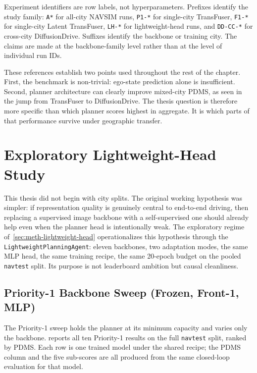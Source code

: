 Experiment identifiers are row labels, not hyperparameters. Prefixes identify the study family: \texttt{A*} for all-city NAVSIM runs, \texttt{P1-*} for single-city TransFuser, \texttt{F1-*} for single-city Latent TransFuser, \texttt{LH-*} for lightweight-head runs, and \texttt{DD-CC-*} for cross-city DiffusionDrive. Suffixes identify the backbone or training city. The claims are made at the backbone-family level rather than at the level of individual run IDs.

These references establish two points used throughout the rest of the chapter. First, the benchmark is non-trivial: ego-state prediction alone is insufficient. Second, planner architecture can clearly improve mixed-city PDMS, as seen in the jump from TransFuser to DiffusionDrive. The thesis question is therefore more specific than which planner scores highest in aggregate. It is which parts of that performance survive under geographic transfer.

\section{Exploratory Lightweight-Head Study}
\label{sec:exp-phase0}

This thesis did not begin with city splits. The original working hypothesis was simpler: if representation quality is genuinely central to end-to-end driving, then replacing a supervised image backbone with a self-supervised one should already help even when the planner head is intentionally weak. The exploratory regime of~\ref{sec:meth-lightweight-head} operationalizes this hypothesis through the \texttt{LightweightPlanningAgent}: eleven backbones, two adaptation modes, the same MLP head, the same training recipe, the same 20-epoch budget on the pooled \texttt{navtest} split. Its purpose is not leaderboard ambition but causal cleanliness.

\subsection{Priority-1 Backbone Sweep (Frozen, Front-1, MLP)}
\label{sec:exp-phase0-p1}

The Priority-1 sweep holds the planner at its minimum capacity and varies only the backbone.  reports all ten Priority-1 results on the full \texttt{navtest} split, ranked by PDMS. Each row is one trained model under the shared recipe; the PDMS column and the five sub-scores are all produced from the same closed-loop evaluation for that model.

